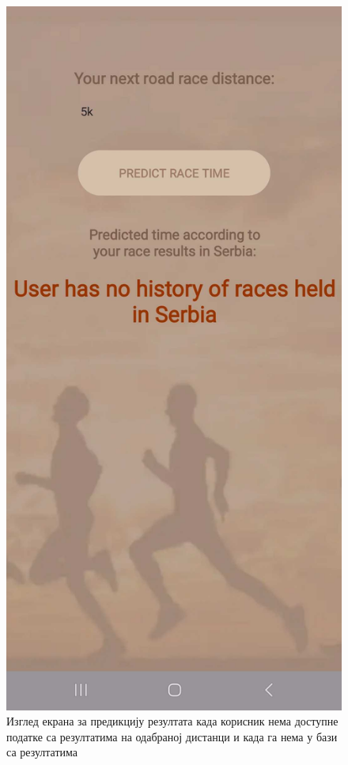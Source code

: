 \documentclass[12pt,oneside]{memoir}
\begin{document}
\begin{figure}[H]
\begin{minipage}{0.25\textwidth}
  \end{minipage}
  \begin{minipage}{0.25\textwidth}
    \centering
    \includegraphics[width=\textwidth]{assets/pictures/app_screenshots/race_prediction_4.jpg}
  \end{minipage}
  \caption{Изглед екрана за предикцију резултата када корисник нема доступне податке са резултатима на одабраној дистанци и када га нема у бази са резултатима}
  \label{pic:race_prediction}
\end{figure}
\end{document}
